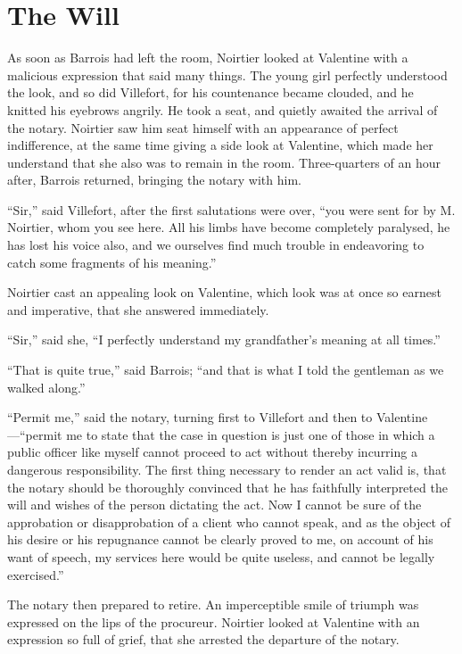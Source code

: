 \chapter{The Will}

As soon as Barrois had left the room, Noirtier looked at Valentine with
a malicious expression that said many things. The young girl perfectly
understood the look, and so did Villefort, for his countenance became
clouded, and he knitted his eyebrows angrily. He took a seat, and
quietly awaited the arrival of the notary. Noirtier saw him seat
himself with an appearance of perfect indifference, at the same time
giving a side look at Valentine, which made her understand that she
also was to remain in the room. Three-quarters of an hour after,
Barrois returned, bringing the notary with him.

“Sir,” said Villefort, after the first salutations were over, “you were
sent for by M. Noirtier, whom you see here. All his limbs have become
completely paralysed, he has lost his voice also, and we ourselves find
much trouble in endeavoring to catch some fragments of his meaning.”

Noirtier cast an appealing look on Valentine, which look was at once so
earnest and imperative, that she answered immediately.

“Sir,” said she, “I perfectly understand my grandfather’s meaning at
all times.”

“That is quite true,” said Barrois; “and that is what I told the
gentleman as we walked along.”

“Permit me,” said the notary, turning first to Villefort and then to
Valentine—“permit me to state that the case in question is just one of
those in which a public officer like myself cannot proceed to act
without thereby incurring a dangerous responsibility. The first thing
necessary to render an act valid is, that the notary should be
thoroughly convinced that he has faithfully interpreted the will and
wishes of the person dictating the act. Now I cannot be sure of the
approbation or disapprobation of a client who cannot speak, and as the
object of his desire or his repugnance cannot be clearly proved to me,
on account of his want of speech, my services here would be quite
useless, and cannot be legally exercised.”

The notary then prepared to retire. An imperceptible smile of triumph
was expressed on the lips of the procureur. Noirtier looked at
Valentine with an expression so full of grief, that she arrested the
departure of the notary.

